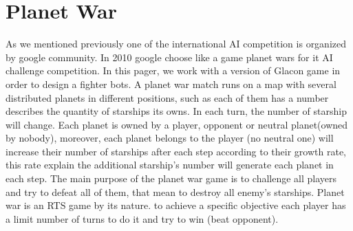 \documentclass[conference]{IEEEtran}
\begin{document}
\section{Planet War}
As we mentioned previously one of the international AI competition is organized by google community. In 2010 google choose like a game planet wars for it AI challenge competition. In this pager, we work with a version of Glacon game in order to design a fighter bots. A planet war match\cite{doc1} runs on a map with several distributed planets in different positions, such as each of them has a number describes the quantity of starships its owns. In each turn, the number of starship will change. Each planet is owned by a player, opponent or neutral planet(owned by nobody), moreover, each planet belongs to the player (no neutral one) will increase their number of starships after each step according to their growth rate, this rate explain the additional starship's number will generate each planet in each step.
The main purpose of the planet war game\cite{doc1} is to challenge all players and try to defeat all of them, that mean to destroy all enemy's starships. Planet war is an RTS game by its nature. to achieve a specific objective each player has a limit number of turns to do it and try to win (beat opponent).  \\
\end{document}
